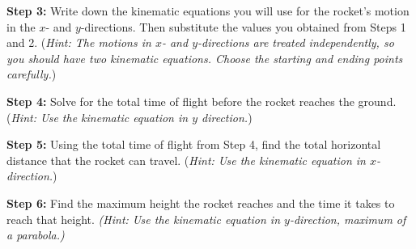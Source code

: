 \documentclass[11pt]{article}
\begin{document}
\newpage
\noindent\textbf{Step 3:} Write down the kinematic equations you will use for the rocket's motion in the $x$- and $y$-directions. Then substitute the values you obtained from Steps 1 and 2. (\textit{Hint: The motions in $x$- and $y$-directions are treated independently, so you should have two kinematic equations. Choose the starting and ending points carefully.})\\
\newline\newline\newline
\newline\newline\newline
\newline\newline\newline

\noindent\textbf{Step 4:} Solve for the total time of flight before the rocket reaches the ground. (\textit{Hint: Use the kinematic equation in $y$ direction.})\\
\newline\newline\newline
\newline\newline\newline
\newline\newline\newline

\noindent\textbf{Step 5:} Using the total time of flight from Step 4, find the total horizontal distance that the rocket can travel. (\textit{Hint: Use the kinematic equation in $x$-direction.})
\newline\newline\newline
\newline\newline\newline
\newline\newline\newline

\noindent\textbf{Step 6:} Find the maximum height the rocket reaches and the time it takes to reach that height. \textit{(Hint: Use the kinematic equation in $y$-direction, maximum of a parabola.)} 
\end{document}
